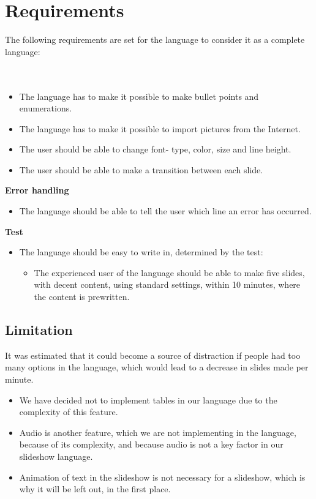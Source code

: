 \section{Requirements}
The following requirements are set for the language to consider it as a complete language:
\\ \\
 \\
\begin{itemize}
\item The language has to make it possible to make bullet points and enumerations.
\item The language has to make it possible to import pictures from the Internet.
\item The user should be able to change font- type, color, size and line height.
\item The user should be able to make a transition between each slide. 
\end{itemize}
\textbf{Error handling}\\
\begin{itemize}
\item The language should be able to tell the user which line an error has occurred. 
\end{itemize}
\textbf{Test}\\
\begin{itemize}
\item The language should be easy to write in, determined by the test:
\begin{itemize}
\item The experienced user of the language should be able to make five slides, with decent content, using standard settings, within 10 minutes, where the content is prewritten.
\end{itemize}
\end{itemize}

\subsection*{Limitation}
It was estimated that it could become a source of distraction if people had too many options in the language, which would lead to a decrease in slides made per minute.

\begin{itemize}
	\item We have decided not to implement tables in our language due to the complexity of this feature.
	\item Audio is another feature, which we are not implementing in the language, because of its complexity, and because audio is not a key factor in our slideshow language.
	\item Animation of text in the slideshow is not necessary for a slideshow, which is why it will be left out, in the first place.
\end{itemize}